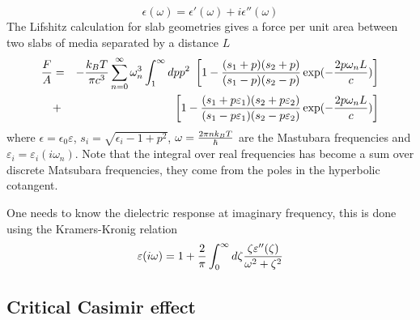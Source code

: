 \begin{equation}
    \epsilon(\omega) = \epsilon'(\omega)+i\epsilon''(\omega)
\end{equation}
 The Lifshitz calculation for slab geometries gives a force per unit area between two slabs of media separated by a distance $L$
 \begin{eqnarray}
 {F\over A} &=& -{k_BT \over \pi c^3}\sum_{n=0}^\infty  \omega_n^3 \int_1^\infty dp p^2 \ 
 \left[ 1-{(s_1+p)(s_2+p)\over (s_1-p)(s_2-p)}\exp(-{2p\omega_n L\over c})\right]\nonumber \\
&+&\left[ 1-{(s_1+p\varepsilon_1)(s_2+p\varepsilon_2)\over (s_1-p\varepsilon_1)(s_2-p\varepsilon_2)}\exp(-{2p\omega_n L\over c})\right]
\end{eqnarray}
where $\epsilon = \epsilon_0\varepsilon$, $s_i = \sqrt{\epsilon_i -1 +p^2}$,
$\omega = {2\pi nk_BT \over \hbar}$ are the Mastubara frequencies and $\varepsilon_i
=\varepsilon_i(i\omega_n)$. Note that the integral over real frequencies has become a sum over discrete Matsubara frequencies, they come from the poles in the hyperbolic cotangent.

One needs to know the dielectric response at imaginary frequency, this is done using the Kramers-Kronig relation
\begin{equation}
    \varepsilon(i\omega)= 1 +{2\over \pi}\int_0^\infty d\zeta {\zeta \varepsilon''(\zeta)\over \omega^2 + \zeta^2}
\end{equation}


    \subsection{Critical Casimir effect}
